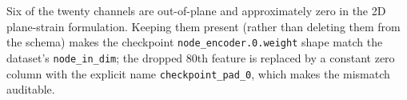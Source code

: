 Six of the twenty channels are out-of-plane and approximately zero
in the 2D plane-strain formulation. Keeping them present (rather than
deleting them from the schema) makes the checkpoint
\texttt{node\_encoder.0.weight} shape match the dataset's
\texttt{node\_in\_dim}; the dropped 80th feature is replaced by a
constant zero column with the explicit name
\texttt{checkpoint\_pad\_0}, which makes the mismatch auditable.
